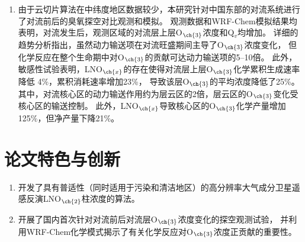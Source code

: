 \begin{enumerate}[label=（\arabic*）, labelindent=\parindent, nosep, leftmargin=0pt, widest=0, itemindent=*, topsep=0pt, partopsep=0pt, parsep=0pt]
\item 由于云切片算法在中纬度地区数据较少，本研究针对中国东部的对流系统进行了对流前后的臭氧探空对比观测和模拟。
观测数据和WRF-Chem模拟结果均表明，对流发生后，观测区域的对流层上层O$_{\ch{3}}$浓度和Q$_v$均增加。
详细的趋势分析指出，虽然动力输送项在对流旺盛期间主导了O$_{\ch{3}}$浓度变化，
但化学反应在整个生命期中对O$_{\ch{3}}$的贡献可达动力输送项的5--10倍。
此外，敏感性试验表明，LNO$_{\ch{x}}$的存在使得对流层上层O$_{\ch{3}}$化学累积生成速率降低 4\%，累积消耗速率增加23\%，
导致该层O$_{\ch{3}}$的平均浓度降低了25\%。
其中，对流核心区的动力输送作用约为层云区的2倍，层云区的O$_{\ch{3}}$变化受核心区的输送控制。
此外，LNO$_{\ch{x}}$导致核心区的O$_{\ch{3}}$化学产量增加125\%，但净产量下降21\%。


\end{enumerate}

\section{论文特色与创新}

\begin{enumerate}[label=（\arabic*）, labelindent=\parindent, nosep, leftmargin=0pt, widest=0, itemindent=*, topsep=0pt, partopsep=0pt, parsep=0pt]

\item 开发了具有普适性（同时适用于污染和清洁地区）的高分辨率大气成分卫星遥感反演LNO$_{\ch{2}}$柱浓度的算法。

\item 开展了国内首次针对对流前后对流层O$_{\ch{3}}$浓度变化的探空观测试验，
并利用WRF-Chem化学模式揭示了有关化学反应对O$_{\ch{3}}$浓度正贡献的重要性。





\end{enumerate}



